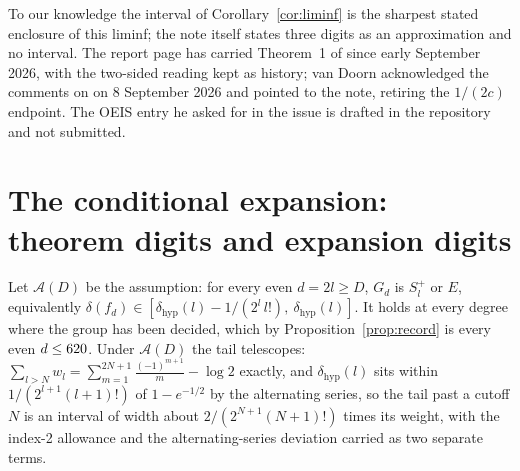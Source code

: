 \documentclass[11pt]{article}
\newcommand{\Sl}{S_l^{+}}
\begin{document}
To our knowledge the interval of Corollary~\ref{cor:liminf} is the sharpest stated enclosure of this liminf; the note itself states three digits as an approximation and no interval. The report page \cite{Report} has carried Theorem~1 of \cite{vD26} since early September 2026, with the two-sided reading kept as history; van Doorn acknowledged the comments on \cite{Issue164} on 8 September 2026 and pointed to the note, retiring the $1/(2c)$ endpoint. The OEIS entry he asked for in the issue is drafted in the repository and not submitted.

\section{The conditional expansion: theorem digits and expansion digits}\label{sec:cond}

Let $\mathcal A(D)$ be the assumption: for every even $d=2l\ge D$, $G_d$ is $\Sl$ or $E$, equivalently $\delta(f_d)\in[\delta_{\mathrm{hyp}}(l)-1/(2^l\,l!),\ \delta_{\mathrm{hyp}}(l)]$. It holds at every degree where the group has been decided, which by Proposition~\ref{prop:record} is every even $d\le620$. Under $\mathcal A(D)$ the tail telescopes: $\sum_{l>N}w_l=\sum_{m=1}^{2N+1}\frac{(-1)^{m+1}}m-\log2$ exactly, and $\delta_{\mathrm{hyp}}(l)$ sits within $1/(2^{l+1}(l+1)!)$ of $1-e^{-1/2}$ by the alternating series, so the tail past a cutoff $N$ is an interval of width about $2/(2^{N+1}(N+1)!)$ times its weight, with the index-2 allowance and the alternating-series deviation carried as two separate terms.
\end{document}
